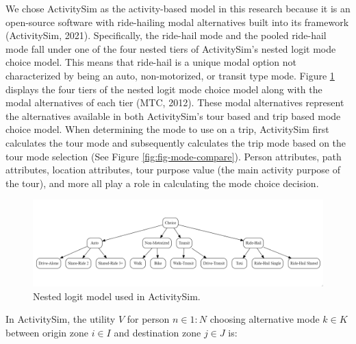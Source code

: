 \documentclass[simple, masters, twoside]{byuthesis}
\begin{document}
We chose ActivitySim as the activity-based model in this research because it is an open-source software with ride-hailing modal alternatives built into its framework (ActivitySim, 2021). Specifically, the ride-hail mode and the pooled ride-hail mode fall under one of the four nested tiers of ActivitySim's nested logit mode choice model. This means that ride-hail is a unique modal option not characterized by being an auto, non-motorized, or transit type mode. Figure \ref{fig:fig-asim-nest} displays the four tiers of the nested logit mode choice model along with the modal alternatives of each tier (MTC, 2012). These modal alternatives represent the alternatives available in both ActivitySim's tour based and trip based mode choice model. When determining the mode to use on a trip, ActivitySim first calculates the tour mode and subsequently calculates the trip mode based on the tour mode selection (See Figure \ref{fig:fig-mode-compare}). Person attributes, path attributes, location attributes, tour purpose value (the main activity purpose of the tour), and more all play a role in calculating the mode choice decision.

\begin{figure}
\includegraphics[width = .75\paperwidth]{nestedLogit.png}
\caption{Nested logit model used in ActivitySim.}
\label{fig:fig-asim-nest}
\end{figure}

In ActivitySim, the utility \(V\) for person \(n \in {1:N}\) choosing alternative mode \(k \in K\) between origin zone \(i \in I\) and destination zone \(j \in J\) is:
\end{document}
